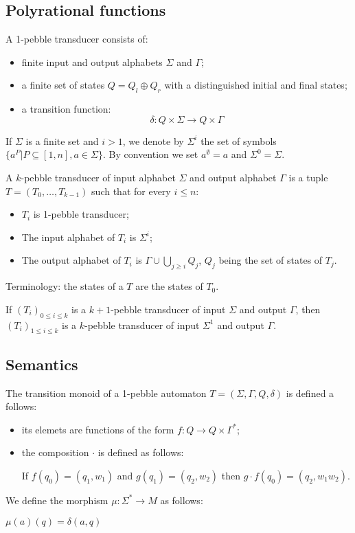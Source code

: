 \subsection{Polyrational functions}
\begin{definition}
A 1-pebble transducer consists of:
\begin{itemize}
\item finite input and output alphabets $\Sigma$ and $\Gamma$;
\item a finite set of states $Q=Q_l\oplus Q_r$ with a distinguished initial and final states;
\item a transition function:
$$ \delta: Q\times \Sigma \to Q\times\Gamma$$
\end{itemize}
\end{definition}

If $\Sigma$ is a finite set and $i>1$, we denote by $\Sigma^{i}$ the set of symbols $\{a^P| P\subseteq [1,n], a\in \Sigma\}$. By convention we set $a^\emptyset=a$ and $\Sigma^0=\Sigma$.  

\begin{definition}
A $k$-pebble transducer of input alphabet $\Sigma$ and output alphabet $\Gamma$ is a tuple $T=(T_0,\dots,T_{k-1})$ such that for every $i\leq n$:
\begin{itemize}
\item  $T_i$ is 1-pebble transducer;
\item  The input alphabet of $T_i$ is $\Sigma^i$;
\item  The output alphabet of $T_i$ is $\Gamma\cup\bigcup_{j\geq i} Q_j$, $Q_j$ being the set of states of $T_j$.
\end{itemize} 
Terminology: the states of a $T$ are the states of $T_0$. 
\end{definition}

\begin{remark}
If $(T_i)_{0 \leq i\leq k}$ is a $k+1$-pebble transducer of input $\Sigma$ and output $\Gamma$, then $(T_i)_{1\leq i\leq k}$ is a $k$-pebble transducer of input $\Sigma^1$ and output $\Gamma$.
\end{remark}

\subsection{Semantics}

\begin{definition}
The transition monoid of a 1-pebble automaton $T=(\Sigma,\Gamma,Q, \delta)$ is defined a follows:
\begin{itemize}
\item its elemets are functions of the form $f:Q\to Q\times\Gamma^*$;
\item the composition $\cdot$ is defined as follows:

If $f(q_0)=(q_1,w_1)$  and $g(q_1)=(q_2, w_2)$ then 
$g\cdot f(q_0) =(q_2, w_1w_2)$.
\end{itemize} 
We define the morphism $\mu:\Sigma^*\to M$ as follows:

$\mu(a)(q)=\delta(a,q)$
\end{definition}


